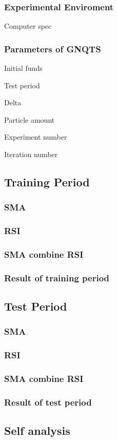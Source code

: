 \documentclass[../main.tex]{subfiles}
\begin{document}
\subsubsection{Experimental Enviroment}
Computer spec

\subsubsection{Parameters of GNQTS}
Initial funds

Test period

Delta

Particle amount

Experiment number

Iteration number

\subsection{Training Period}

\subsubsection{SMA}


\subsubsection{RSI}


\subsubsection{SMA combine RSI}


\subsubsection{Result of training period}


\subsection{Test Period}


\subsubsection{SMA}


\subsubsection{RSI}


\subsubsection{SMA combine RSI}


\subsubsection{Result of test period}


\subsection{Self analysis}
\end{document}
